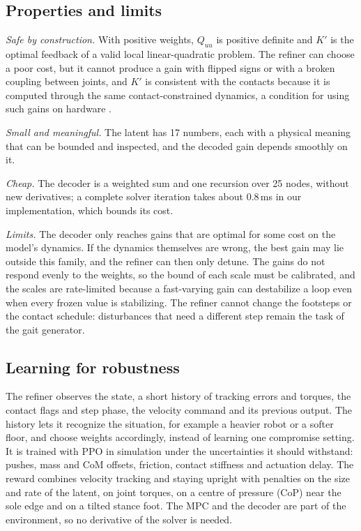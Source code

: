 \documentclass[conference]{IEEEtran}
\begin{document}
\subsection{Properties and limits}
\emph{Safe by construction.} With positive weights, $Q_{uu}$ is positive definite and $K'$ is the optimal feedback of a valid local linear-quadratic problem.
The refiner can choose a poor cost, but it cannot produce a gain with flipped signs or with a broken coupling between joints, and $K'$ is consistent with the contacts because it is computed through the same contact-constrained dynamics, a condition for using such gains on hardware \cite{grandia2019feedback}.

\emph{Small and meaningful.} The latent has 17 numbers, each with a physical meaning that can be bounded and inspected, and the decoded gain depends smoothly on it.

\emph{Cheap.} The decoder is a weighted sum and one recursion over 25 nodes, without new derivatives; a complete solver iteration takes about 0.8\,ms in our implementation, which bounds its cost.

\emph{Limits.} The decoder only reaches gains that are optimal for some cost on the model's dynamics.
If the dynamics themselves are wrong, the best gain may lie outside this family, and the refiner can then only detune.
The gains do not respond evenly to the weights, so the bound of each scale must be calibrated, and the scales are rate-limited because a fast-varying gain can destabilize a loop even when every frozen value is stabilizing.
The refiner cannot change the footsteps or the contact schedule: disturbances that need a different step remain the task of the gait generator.

\subsection{Learning for robustness}
The refiner observes the state, a short history of tracking errors and torques, the contact flags and step phase, the velocity command and its previous output.
The history lets it recognize the situation, for example a heavier robot or a softer floor, and choose weights accordingly, instead of learning one compromise setting.
It is trained with PPO \cite{schulman2017ppo} in simulation under the uncertainties it should withstand: pushes, mass and CoM offsets, friction, contact stiffness and actuation delay.
The reward combines velocity tracking and staying upright with penalties on the size and rate of the latent, on joint torques, on a centre of pressure (CoP) near the sole edge and on a tilted stance foot.
The MPC and the decoder are part of the environment, so no derivative of the solver is needed.
\end{document}
